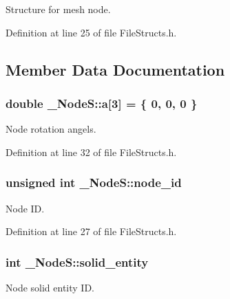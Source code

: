 Structure for mesh node. 

Definition at line 25 of file File\+Structs.\+h.



\subsection{Member Data Documentation}
\subsubsection[{\texorpdfstring{a}{a}}]{\setlength{\rightskip}{0pt plus 5cm}double \+\_\+\+Node\+S\+::a\mbox{[}3\mbox{]} = \{ 0, 0, 0 \}}\hypertarget{struct___node_s_a4af2fedf51326cedd3244b54a0684935}{}\label{struct___node_s_a4af2fedf51326cedd3244b54a0684935}


Node rotation angels. 



Definition at line 32 of file File\+Structs.\+h.

\subsubsection[{\texorpdfstring{node\+\_\+id}{node_id}}]{\setlength{\rightskip}{0pt plus 5cm}unsigned int \+\_\+\+Node\+S\+::node\+\_\+id}\hypertarget{struct___node_s_a03170eedacfbc42024a0e556858ead3f}{}\label{struct___node_s_a03170eedacfbc42024a0e556858ead3f}


Node ID. 



Definition at line 27 of file File\+Structs.\+h.

\subsubsection[{\texorpdfstring{solid\+\_\+entity}{solid_entity}}]{\setlength{\rightskip}{0pt plus 5cm}int \+\_\+\+Node\+S\+::solid\+\_\+entity}\hypertarget{struct___node_s_a9ded714a4c7575d4dc9c721f8560f861}{}\label{struct___node_s_a9ded714a4c7575d4dc9c721f8560f861}


Node solid entity ID. 



